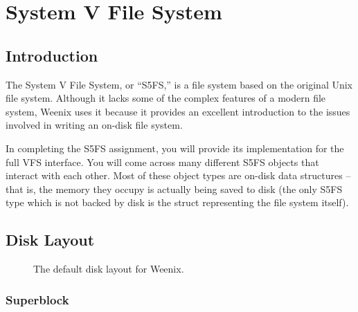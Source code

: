 \chapter{System V File System}
\label{s5fs}

\section{Introduction}

The System V File System, or ``S5FS,'' is a file system based on the original Unix file system.  Although it lacks some of the complex features of a modern file system, Weenix uses it because it provides an excellent introduction to the issues involved in writing an on-disk file system.

In completing the S5FS assignment, you will provide its implementation for the full VFS interface.  You will come across many different S5FS objects that interact with each other.  Most of these object types are on-disk data structures -- that is, the memory they occupy is actually being saved to disk (the only S5FS type which is not backed by disk is the struct representing the file system itself).

\section{Disk Layout}

\begin{figure}
    \centering
    \caption{The default disk layout for Weenix.}
\end{figure}

\subsection{Superblock}

